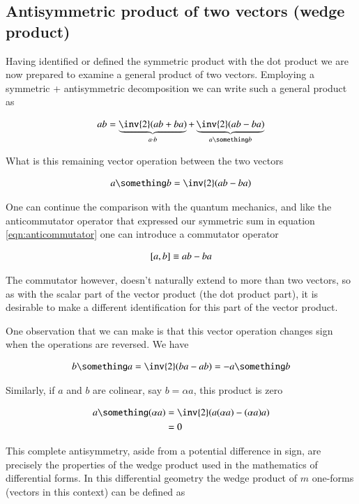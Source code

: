 \subsection{ Antisymmetric product of two vectors (wedge product) }

Having identified or defined the symmetric product with the dot product we are now prepared to examine a general product of two vectors.  Employing a symmetric + antisymmetric decomposition we can write such a general product as

\begin{align*}
a b = \underbrace{\inv{2}(a b + b a)}_{a \cdot b} + \underbrace{ \inv{2} ( a b - b a ) }_{ a \something b }
\end{align*}

What is this remaining vector operation between the two vectors

\begin{align*}
a \something b = \inv{2} ( a b - b a )
\end{align*}

One can continue the comparison with the quantum mechanics, and like the
anticommutator operator that expressed our symmetric sum in equation
\ref{eqn:anticommutator} one can introduce a commutator operator

\begin{align}\label{eqn:commutator}
\left[{a},{b}\right] \equiv a b - b a
\end{align}

The commutator however, doesn't naturally extend to more than two vectors, so
as with the scalar part of the vector product (the dot product part), 
it is desirable to make a different identification for this part of the vector
product.

One observation that we can make is that this vector operation changes sign when the operations are reversed.  We have

\begin{align*}
b \something a = \inv{2} ( b a - a b) = - a \something b
\end{align*}

Similarly, if $a$ and $b$ are colinear, say $b = \alpha a$, this product is zero

\begin{align*}
a \something (\alpha a)
&= \inv{2} ( a  (\alpha a) - (\alpha a) a ) \\
&= 0
\end{align*}

This complete antisymmetry, aside from a potential difference in sign, are precisely the properties of the wedge product used in the mathematics of differential forms.  In this differential geometry the wedge product of $m$ one-forms (vectors in this context) can be defined as

